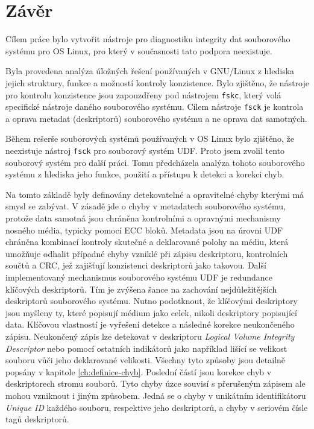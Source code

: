 \chapter{Závěr}
Cílem práce bylo vytvořit nástroje pro diagnostiku integrity dat souborového systému pro OS Linux, pro který v současnosti tato podpora neexistuje.

Byla provedena analýza úložných řešení používaných v GNU/Linux z hlediska jejich struktury, funkce a možností kontroly konzistence. Bylo zjištěno, že nástroje pro kontrolu konzistence jsou zapouzdřeny pod nástrojem \texttt{fskc}, který volá specifické nástroje daného souborového systému. Cílem nástroje \texttt{fsck} je kontrola a oprava metadat (deskriptorů) souborového systému a ne oprava dat samotných.

Během rešerše souborových systémů používaných v OS Linux bylo zjištěno, že neexistuje nástroj \texttt{fsck} pro souborový systém UDF. Proto jsem zvolil tento souborový systém pro další práci. Tomu předcházela analýza tohoto souborového systému z hlediska jeho funkce, použití a přístupu k detekci a korekci chyb.

Na tomto základě byly definovány detekovatelné a opravitelné chyby kterými má smysl se zabývat. V zásadě jde o chyby v metadatech souborového systému, protože data samotná jsou chráněna kontrolními a opravnými mechanismy nosného média, typicky pomocí ECC bloků. Metadata jsou na úrovni UDF chráněna kombinací kontroly skutečné a deklarované polohy na médiu, která umožňuje odhalit případné chyby vzniklé při zápisu deskriptoru, kontrolních součtů a CRC, jež zajišťují konzistenci deskriptorů jako takovou. Další implementovaný mechanismus souborového systému UDF je redundance klíčových deskriptorů. Tím je zvýšena šance na zachování nejdůležitějších deskriptorů souborového systému. Nutno podotknout, že klíčovými deskriptory jsou myšleny ty, které popisují médium jako celek, nikoli deskriptory popisující data. Klíčovou vlastností je vyřešení detekce a následné korekce neukončeného zápisu. Neukončený zápis lze detekovat v deskriptoru \textit{Logical Volume Integrity Descriptor} nebo pomocí ostatních indikátorů jako například lišící se velikost souboru vůči jeho deklarované velikosti. Všechny tyto způsoby jsou detailně popsány v kapitole \ref{ch:definice-chyb}. Poslední částí jsou korekce chyb v deskriptorech stromu souborů. Tyto chyby úzce souvisí s přerušeným zápisem ale mohou vzniknout i jiným způsobem. Jedná se o chyby v unikátním identifikátoru \textit{Unique ID} každého souboru, respektive jeho deskriptorů, a chyby v seriovém čísle tagů deskriptorů.

